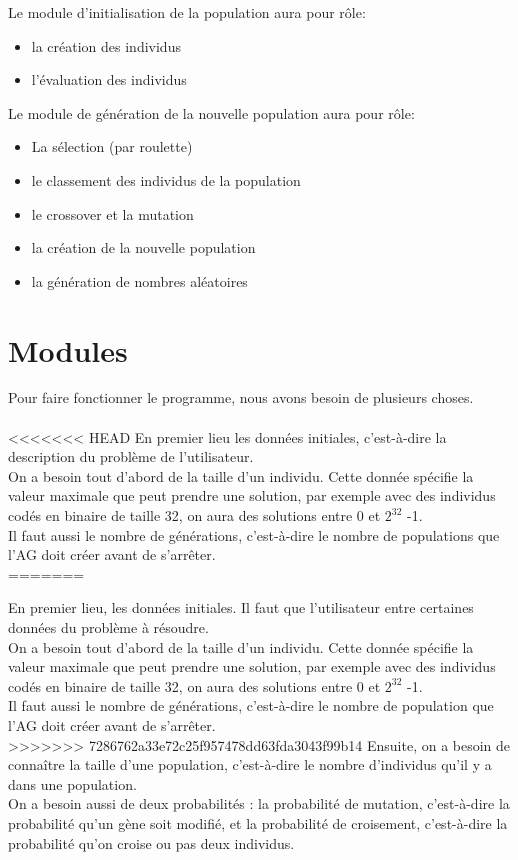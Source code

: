 \documentclass[a4paper,11pt]{article}
\begin{document}
		Le module d’initialisation de la population aura pour rôle:
		\begin{itemize}
				\item la création des individus
				\item l’évaluation des individus\\
		\end{itemize}
		Le module de génération de la nouvelle population aura pour rôle:
		\begin{itemize}
				\item La sélection (par roulette)
				\item le classement des individus de la population
				\item le crossover et la mutation
				\item la création de la nouvelle population
				\item la génération de nombres aléatoires\\
		\end{itemize}
		

	\section{Modules}
		Pour faire fonctionner le programme, nous avons besoin de plusieurs choses.\\
		\\
<<<<<<< HEAD
		En premier lieu les données initiales, c'est-à-dire la description du problème de l'utilisateur.\\
		On a besoin tout d’abord de la taille d’un individu. 
		Cette donnée spécifie la valeur maximale que peut prendre une solution, par exemple avec des individus codés en binaire de taille 32, on aura des solutions entre 0 et $2^{32}$ -1.\\
		Il faut aussi le nombre de générations, c’est-à-dire le nombre de populations que l’AG doit créer avant de s’arrêter.\\
=======

		En premier lieu, les données initiales. Il faut que l'utilisateur entre certaines données du problème à résoudre.\\
		On a besoin tout d’abord de la taille d’un individu. 
		Cette donnée spécifie la valeur maximale que peut prendre une solution, par exemple avec des individus codés en binaire de taille 32, on aura des solutions entre 0 et $2^{32}$ -1.\\
		Il faut aussi le nombre de générations, c’est-à-dire le nombre de population que l’AG doit créer avant de s’arrêter.\\
>>>>>>> 7286762a33e72c25f957478dd63fda3043f99b14
		Ensuite, on a besoin de connaître la taille d’une population, c’est-à-dire le nombre d’individus qu’il y a dans une population.\\
		On a besoin aussi de deux probabilités : la probabilité de mutation, c’est-à-dire la probabilité qu’un gène soit modifié, et la probabilité de croisement, c’est-à-dire la probabilité qu’on croise ou pas deux individus. 
		
\end{document}
